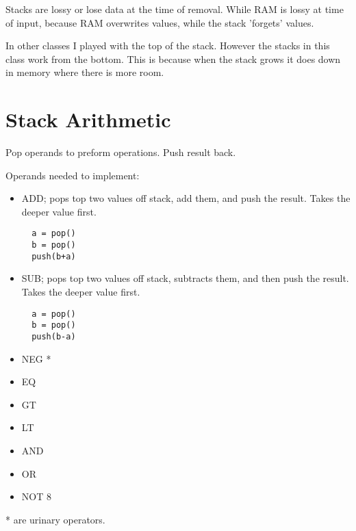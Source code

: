 \documentclass[12pt]{article}
\begin{document}
Stacks are lossy or lose data at the time of removal. While RAM is lossy at
time of input, because RAM overwrites values, while the stack 'forgets' values.

In other classes I played with the top of the stack. However the stacks in this
class work from the bottom. This is because when the stack grows it does down
in memory where there is more room.

\clearpage

\section*{Stack Arithmetic}
Pop operands to preform operations. Push result back.

Operands needed to implement:
\begin{itemize}
  \item
    ADD; pops top two values off stack, add them, and push the result. Takes
    the deeper value first.
    \begin{verbatim}
  a = pop()
  b = pop()
  push(b+a)
    \end{verbatim}
  \item
    SUB; pops top two values off stack, subtracts them, and then push the
    result. Takes the deeper value first.
    \begin{verbatim}
  a = pop()
  b = pop()
  push(b-a)
    \end{verbatim}
  \item
    NEG *
  \item
    EQ
  \item
    GT
  \item
    LT
  \item
    AND
  \item
    OR
  \item
    NOT 8
\end{itemize}
* are urinary operators.
\end{document}
